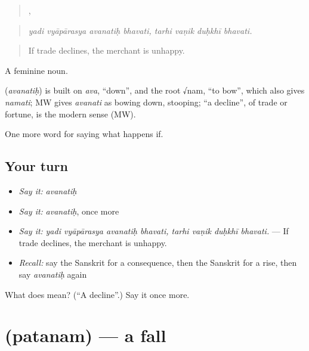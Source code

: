\begin{quote}
   ,    
\end{quote}

\begin{quote}
\emph{yadi vyāpārasya avanatiḥ bhavati, tarhi vaṇik duḥkhī bhavati.}
\end{quote}

\begin{quote}
If trade declines, the merchant is unhappy.
\end{quote}

A feminine noun.

\begin{cousinweb}
\textbf{} (\emph{avanatiḥ}) is built on \emph{ava}, \textquotedblleft{}down\textquotedblright{}, and the root √nam, \textquotedblleft{}to bow\textquotedblright{}, which also gives \emph{namati}; MW gives \emph{avanati} as bowing down, stooping; \textquotedblleft{}a decline\textquotedblright{}, of trade or fortune, is the modern sense (MW).
\end{cousinweb}

\begin{grammarlens}[title={What you've built}]
One more word for saying what happens if.
\end{grammarlens}

\subsection*{Your turn}
\begin{itemize}
\raggedright
  \item \emph{Say it:} \emph{avanatiḥ}
  \item \emph{Say it:} \emph{avanatiḥ}, once more
  \item \emph{Say it:} \emph{yadi vyāpārasya avanatiḥ bhavati, tarhi vaṇik duḥkhī bhavati.} — If trade declines, the merchant is unhappy.
  \item \emph{Recall:} say the Sanskrit for a consequence, then the Sanskrit for a rise, then say \emph{avanatiḥ} again
\end{itemize}

\begin{tcolorbox}[breakable,colback=teal!4,colframe=teal!35!black,title={Before you move on}]
What does  mean? (\textquotedblleft{}A decline\textquotedblright{}.) Say it once more.
\end{tcolorbox}
\section[\texorpdfstring{\sk{पतनम्} (patanam)}{पतनम् (patanam)}]{ (patanam) — a fall}

